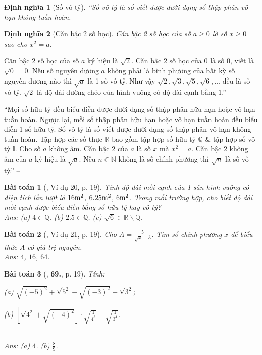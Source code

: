 \documentclass{article}
\numberwithin{equation}{section}
\newtheorem{dinhnghia}{Định nghĩa}[section]
\newtheorem{baitoan}{Bài toán}
\begin{document}
\begin{dinhnghia}[Số vô tỷ]
	``\emph{Số vô tỷ} là số viết được dưới dạng số thập phân vô hạn không tuần hoàn.
\end{dinhnghia}

\begin{dinhnghia}[Căn bậc 2 số học]
	\emph{Căn bậc 2 số học} của số $a\ge 0$ là số $x\ge 0$ sao cho $x^2 = a$.
\end{dinhnghia}
Căn bậc 2 số học của số $a$ ký hiệu là $\sqrt{2}$. Căn bậc 2 số học của $0$ là số $0$, viết là $\sqrt{0} = 0$. Nếu số nguyên dương $a$ không phải là bình phương của bất kỳ số nguyên dương nào thì $\sqrt{a}$ là 1 số vô tỷ. Như vậy $\sqrt{2},\sqrt{3},\sqrt{5},\sqrt{6},\ldots$ đều là số vô tỷ. $\sqrt{2}$ là độ dài đường chéo của hình vuông có độ dài cạnh bằng $1$.'' -- \cite[Chap. 2, \S1, p. 19]{Tuyen_Toan_7}

``Mọi số hữu tỷ đều biểu diễn được dưới dạng số thập phân hữu hạn hoặc vô hạn tuần hoàn. Ngược lại, mỗi số thập phân hữu hạn hoặc vô hạn tuần hoàn đều biểu diễn 1 số hữu tỷ. Số vô tỷ là số viết được dưới dạng số thập phân vô hạn không tuần hoàn. Tập hợp các số thực $\mathbb{R}$ bao gồm tập hợp số hữu tỷ $\mathbb{Q}$ \& tập hợp số vô tỷ $\mathbb{I}$. Cho số $a$ không âm. Căn bậc 2 của $a$ là số $x$ mà $x^2 = a$. Căn bậc 2 không âm của $a$ ký hiệu là $\sqrt{a}$. Nếu $n\in\mathbb{N}$ không là số chính phương thì $\sqrt{n}$ là số vô tỷ.'' -- \cite[\S7]{Binh_Toan_7_tap_1}

\begin{baitoan}[\cite{Tuyen_Toan_7}, Ví dụ 20, p. 19]
	Tính độ dài mỗi cạnh của 1 sân hình vuông có diện tích lần lượt là $\rm16m^2$, $\rm6.25m^2$, $\rm6m^2$. Trong mỗi trường hợp, cho biết độ dài mỗi cạnh được biểu diễn bằng số hữu tỷ hay vô tỷ?\\\mbox{}\hfill{\sf Ans:} (a) $4\in\mathbb{Q}$. (b) $2.5\in\mathbb{Q}$. (c) $\sqrt{6}\in\mathbb{R}\backslash\mathbb{Q}$.
\end{baitoan}

\begin{baitoan}[\cite{Tuyen_Toan_7}, Ví dụ 21, p. 19]
	Cho $A = \frac{5}{\sqrt{x} - 3}$. Tìm số chính phương $x$ để biểu thức $A$ có giá trị nguyên.\\\mbox{}\hfill{\sf Ans:} $4$, $16$, $64$.
\end{baitoan}

\begin{baitoan}[\cite{Tuyen_Toan_7}, \textbf{69.}, p. 19]
	Tính:
	\begin{enumerate*}
		\item[(a)] $\sqrt{(-5)^2} + \sqrt{5^2} - \sqrt{(-3)^2} - \sqrt{3^2}$;
		\item[(b)] $\left[\sqrt{4^2} + \sqrt{(-4)^2}\right]\cdot\sqrt{\frac{1}{4^3}} - \sqrt{\frac{1}{3^4}}$.
	\end{enumerate*}\\\mbox{}\hfill{\sf Ans:} (a) $4$. (b) $\frac{8}{9}$.
\end{baitoan}
\end{document}
